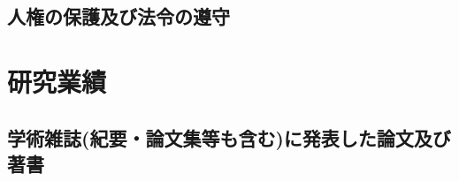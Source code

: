 \documentclass[11pt,a4paper,uplatex,twoside,dvipdfmx]{ujarticle} 	%
\renewcommand{\bf}{\bfseries\sffamily\gtfamily}
\newcommand{\研究課題名}{\mgfamily ストカスティックインフレーション, 原始ブラックホール, および重力波観測}
\newcommand{\研究機関名}{\mgfamily 名古屋大学}
\newcommand{\申請者氏名}{\mgfamily 多田 祐一郎}
\newcommand{\研究代表者氏名}{\申請者氏名}
\newcommand{\研究期間の最終元号年度}{34}	%
\begin{document}
\subsection{人権の保護及び法令の遵守}
\newcommand{\人権の保護及び法令等の遵守への対応}{%
	本研究は該当しない.
}

\section{研究業績}
\renewcommand{\応募者の研究遂行能力}{%
	\vspace{10\baselineskip}
}

\subsection{学術雑誌(紀要・論文集等も含む)に発表した論文及び著書}
\newcommand{\学術雑誌等に発表した論文または著書}{%
	\vspace{10\baselineskip}
	
				

}
\end{document}

